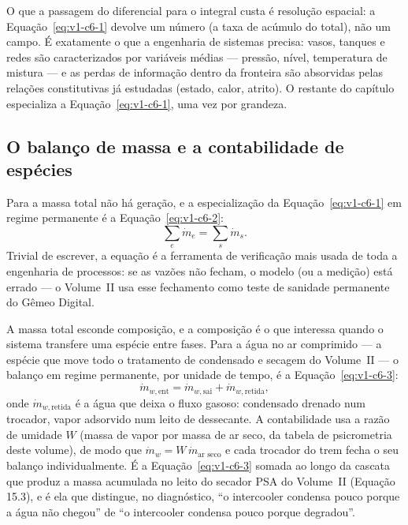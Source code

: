 \documentclass[12pt,a4paper]{article}
\numberwithin{equation}{section}
\numberwithin{table}{section}
\numberwithin{figure}{section}
\begin{document}
O que a passagem do diferencial para o integral custa é resolução espacial: a
Equação~\eqref{eq:v1-c6-1} devolve um número (a taxa de acúmulo do total), não
um campo. É exatamente o que a engenharia de sistemas precisa: vasos, tanques
e redes são caracterizados por variáveis médias --- pressão, nível,
temperatura de mistura --- e as perdas de informação dentro da fronteira são
absorvidas pelas relações constitutivas já estudadas (estado, calor,
atrito). O restante do capítulo especializa a
Equação~\eqref{eq:v1-c6-1}, uma vez por grandeza.

\subsection{O balanço de massa e a contabilidade de
espécies}\label{sub:v1-c6-massa}

Para a massa total não há geração, e a especialização da
Equação~\eqref{eq:v1-c6-1} em regime permanente é a
Equação~\eqref{eq:v1-c6-2}:
\begin{equation}\label{eq:v1-c6-2}
\sum_e \dot{m}_e = \sum_s \dot{m}_s .
\end{equation}
Trivial de escrever, a equação é a ferramenta de verificação mais usada de
toda a engenharia de processos: se as vazões não fecham, o modelo (ou a
medição) está errado --- o Volume~II usa esse fechamento como teste de
sanidade permanente do Gêmeo Digital.

A massa total esconde composição, e a composição é o que interessa quando o
sistema transfere uma espécie entre fases. Para a água no ar comprimido ---
a espécie que move todo o tratamento de condensado e secagem do Volume~II ---
o balanço em regime permanente, por unidade de tempo, é a
Equação~\eqref{eq:v1-c6-3}:
\begin{equation}\label{eq:v1-c6-3}
\dot{m}_{w,\text{ent}} = \dot{m}_{w,\text{sai}} + \dot{m}_{w,\text{retida}},
\end{equation}
onde $\dot{m}_{w,\text{retida}}$ é a água que deixa o fluxo gasoso: condensado
drenado num trocador, vapor adsorvido num leito de dessecante. A contabilidade
usa a razão de umidade $W$ (massa de vapor por massa de ar seco, da tabela de
psicrometria deste volume), de modo que $\dot{m}_w = W\,\dot{m}_{\text{ar
seco}}$ e cada trocador do trem fecha o seu balanço individualmente. É a
Equação~\eqref{eq:v1-c6-3} somada ao longo da cascata que produz a massa
acumulada no leito do secador PSA do Volume~II (Equação 15.3), e é ela que
distingue, no diagnóstico, ``o intercooler condensa pouco porque a água não
chegou'' de ``o intercooler condensa pouco porque degradou''.
\end{document}
